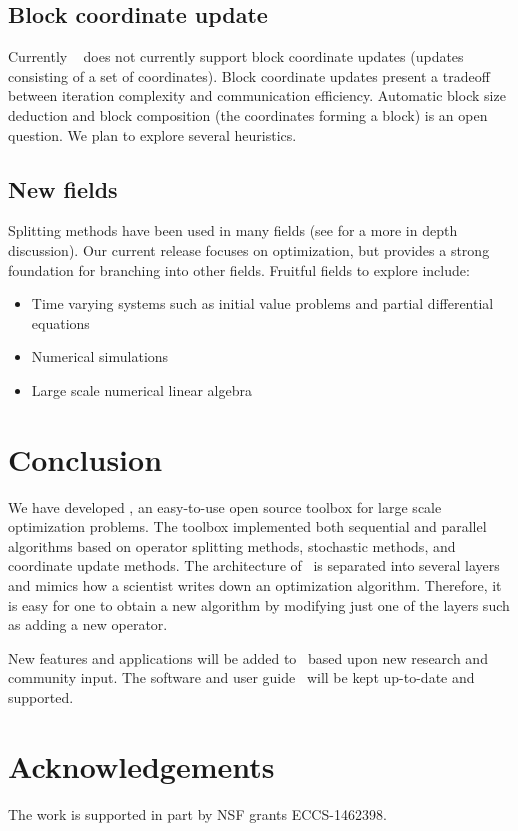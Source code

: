 \subsection{Block coordinate update}
  Currently \pkg~ does not currently support block coordinate updates (updates consisting of a set of coordinates). Block coordinate updates present a tradeoff between iteration complexity and communication efficiency.
  Automatic block size deduction and block composition (the coordinates forming a block) is an open question.
We plan to explore several heuristics.

\subsection{New fields}

Splitting methods have been used in many fields (see \citep{roland2016some} for a more in depth discussion).
Our current release focuses on optimization, but provides a strong foundation for branching into other fields.
Fruitful fields to explore include:

\begin{itemize}
\item Time varying systems such as initial value problems and partial differential equations
\item Numerical simulations
\item Large scale numerical linear algebra 
\end{itemize}


\section{Conclusion }
We have developed \pkg, an easy-to-use open source toolbox for large scale optimization problems.
The toolbox implemented both sequential and parallel algorithms based on operator splitting methods, stochastic methods,
and coordinate update methods. The architecture of \pkg~is separated into several layers and mimics how a scientist writes down an optimization algorithm. Therefore, it is easy for one to obtain a new algorithm by modifying just one of the layers such as adding a new operator.


New features and applications will be added to \pkg~based upon new research and community input. The software and user guide \repo~will be kept up-to-date and supported.

\section{Acknowledgements}
The work is supported in part by NSF grants ECCS-1462398.